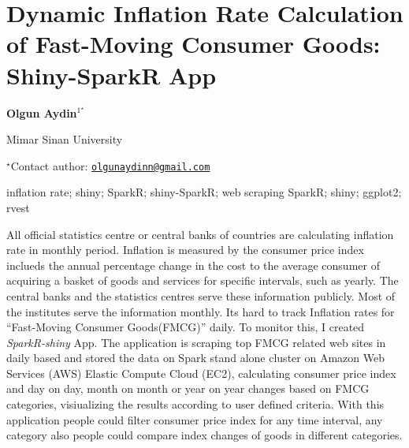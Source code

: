 \documentclass[\main/boa.tex]{subfiles}
\begin{document}
\section{Dynamic Inflation Rate Calculation of Fast-Moving Consumer Goods:
Shiny-SparkR App}

\begin{center}
  {\bf {} Olgun Aydin$^{1^\star}$}
\end{center}

\vskip 0.3cm

\begin{affiliations}
\begin{enumerate}
\begin{minipage}{0.915\textwidth}
\centering
\item Mimar Sinan University \\[-2pt]
\end{minipage}
\end{enumerate}
$^\star$Contact author: \href{mailto:olgunaydinn@gmail.com}{\nolinkurl{olgunaydinn@gmail.com}}\\
\end{affiliations}

\vskip 0.5cm

\begin{minipage}{0.915\textwidth}
\keywords inflation rate; shiny; SparkR; shiny-SparkR; web scraping
\packages {} SparkR;  shiny;  ggplot2;  rvest
\end{minipage}

\vskip 0.8cm

All official statistics centre or central banks of countries are
calculating inflation rate in monthly period. Inflation is measured by
the consumer price index inclueds the annual percentage change in the
cost to the average consumer of acquiring a basket of goods and services
for specific intervals, such as yearly. The central banks and the
statistics centres serve these information publicly. Most of the
institutes serve the information monthly. Its hard to track Inflation
rates for ``Fast-Moving Consumer Goods(FMCG)'' daily. To monitor this, I
created \emph{SparkR-shiny} App. The application is scraping top FMCG
related web sites in daily based and stored the data on Spark stand
alone cluster on Amazon Web Services (AWS) Elastic Compute Cloud (EC2),
calculating consumer price index and day on day, month on month or year
on year changes based on FMCG categories, visiualizing the results
according to user defined criteria. With this application people could
filter consumer price index for any time interval, any category also
people could compare index changes of goods in different categories.
\end{document}
